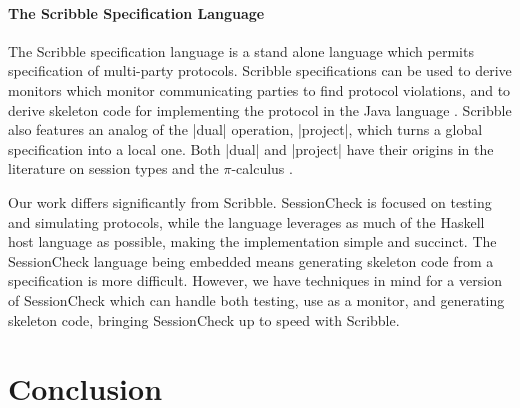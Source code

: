 \documentclass{article}
\begin{document}
\paragraph{The Scribble Specification Language}
%
The Scribble specification language \cite{Scribble} is a stand alone language
which permits specification of multi-party protocols.
%
Scribble specifications can be used to derive monitors which monitor communicating
parties to find protocol violations, and to derive skeleton code for implementing
the protocol in the Java language \cite{Java}.
%
Scribble also features an analog of the |dual| operation, |project|, which turns a
global specification into a local one.
%
Both |dual| and |project| have their origins in the literature on session types
\cite{HondaSessionTypes} and the $\pi$-calculus \cite{PICalculus}.

Our work differs significantly from Scribble.
%
SessionCheck is focused on testing and simulating protocols, while the language
leverages as much of the Haskell host language as possible, making the implementation
simple and succinct.
%
The SessionCheck language being embedded means generating skeleton code from a
specification is more difficult.
%
However, we have techniques in mind for a version of SessionCheck which can handle
both testing, use as a monitor, and generating skeleton code, bringing SessionCheck
up to speed with Scribble.
%

\section{Conclusion}
\end{document}
